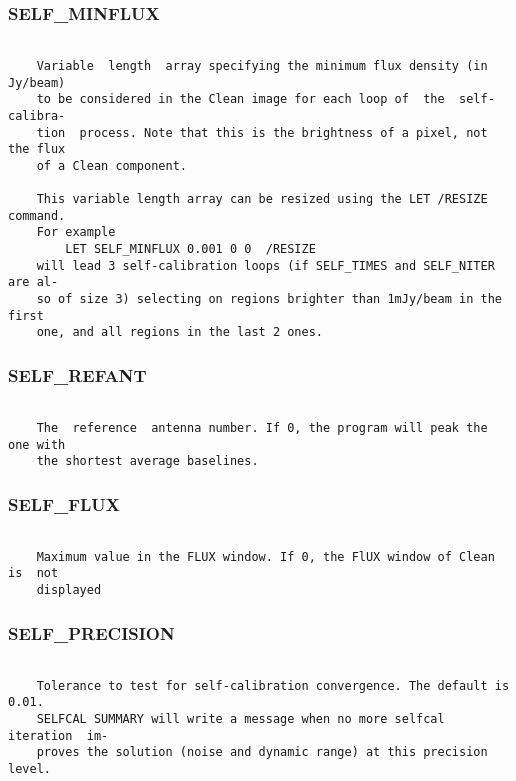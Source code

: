 \subsubsection{SELF\_MINFLUX}
\begin{verbatim}

    Variable  length  array specifying the minimum flux density (in Jy/beam)
    to be considered in the Clean image for each loop of  the  self-calibra-
    tion  process. Note that this is the brightness of a pixel, not the flux
    of a Clean component.

    This variable length array can be resized using the LET /RESIZE command.
    For example
        LET SELF_MINFLUX 0.001 0 0  /RESIZE
    will lead 3 self-calibration loops (if SELF_TIMES and SELF_NITER are al-
    so of size 3) selecting on regions brighter than 1mJy/beam in the  first
    one, and all regions in the last 2 ones.

\end{verbatim}
\subsubsection{SELF\_REFANT}
\begin{verbatim}

    The  reference  antenna number. If 0, the program will peak the one with
    the shortest average baselines.

\end{verbatim}
\subsubsection{SELF\_FLUX}
\begin{verbatim}

    Maximum value in the FLUX window. If 0, the FlUX window of Clean is  not
    displayed

\end{verbatim}
\subsubsection{SELF\_PRECISION}
\begin{verbatim}

    Tolerance to test for self-calibration convergence. The default is 0.01.
    SELFCAL SUMMARY will write a message when no more selfcal iteration  im-
    proves the solution (noise and dynamic range) at this precision level.

\end{verbatim}
